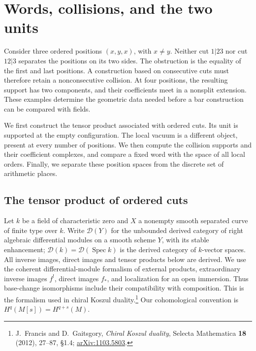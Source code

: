 \chapter{Words, collisions, and the two units}
\label{v4-ch:words-collisions-units}

Consider three ordered positions \((x,y,x)\), with \(x\ne y\).
Neither cut \(1|23\) nor cut \(12|3\) separates the positions
on its two sides. The obstruction is the equality of the first
and last positions. A construction based on consecutive cuts
must therefore retain a nonconsecutive collision. At four
positions, the resulting support has two components, and their
coefficients meet in a nonsplit extension. These examples determine
the geometric data needed before a bar construction can be compared
with fields.

We first construct the tensor product associated with ordered cuts.
Its unit is supported at the empty configuration. The local vacuum
is a different object, present at every number of positions. We then
compute the collision supports and their coefficient complexes, and
compare a fixed word with the space of all local orders. Finally,
we separate these position spaces from the discrete set of arithmetic
places.

\section{The tensor product of ordered cuts}
\label{v4-sec:word-cut-tensor}

Let \(k\) be a field of characteristic zero and \(X\) a nonempty
smooth separated curve of finite type over \(k\). Write
\(\mathcal D(Y)\) for the unbounded derived category of right
algebraic differential modules on a smooth scheme \(Y\), with its
stable enhancement; \(\mathcal D(k)=\mathcal D(\operatorname{Spec}k)\)
is the derived category of \(k\)-vector spaces. All inverse images, direct images and tensor
products below are derived. We use the coherent differential-module
formalism of external products, extraordinary inverse images \(f^!\),
direct images \(f_*\), and localization for an open immersion.
Thus base-change isomorphisms include their compatibility with
composition. This is the formalism used in chiral Koszul duality.\footnote{
J.~Francis and D.~Gaitsgory, \emph{Chiral Koszul duality},
Selecta Mathematica \textbf{18} (2012), 27--87,
\S1.4; \href{https://arxiv.org/abs/1103.5803}{arXiv:1103.5803}.}
Our cohomological convention is
\(H^q(M[s])=H^{q+s}(M)\).

